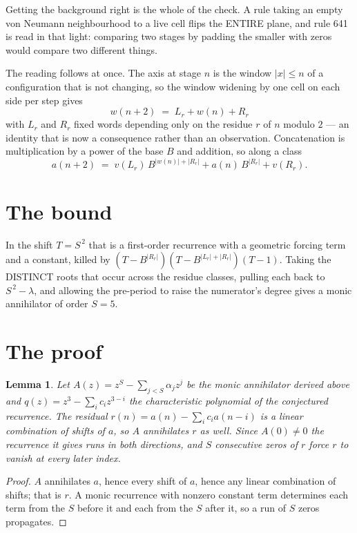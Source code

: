 \documentclass[11pt,a4paper]{article}
\theoremstyle{plain}
\newtheorem{lemma}[theorem]{Lemma}
\theoremstyle{definition}
\begin{document}
Getting the background right is the whole of the check. A rule taking an empty von Neumann
neighbourhood to a live cell flips the ENTIRE plane, and rule 641 is read
in that light: comparing two stages by padding the smaller with zeros would compare two
different things.

The reading follows at once. The axis at stage $n$ is the window $|x|\le n$ of a configuration
that is not changing, so the window widening by one cell on each side per step gives
\[
w(n+2)\;=\;L_r + w(n) + R_r
\]
with $L_r$ and $R_r$ fixed words depending only on the residue $r$ of $n$ modulo $2$ --- an
identity that is now a consequence rather than an observation. Concatenation is multiplication
by a power of the base $B$ and addition, so along a class
\[
a(n+2)\;=\;v(L_r)\,B^{|w(n)|+|R_r|} + a(n)\,B^{|R_r|} + v(R_r).
\]

\section{The bound}

In the shift $T=S^{\,2}$ that is a first-order recurrence with a geometric forcing term and a
constant, killed by $(T-B^{|R_r|})(T-B^{|L_r|+|R_r|})(T-1)$. Taking the DISTINCT roots that
occur across the residue classes, pulling each back to $S^{\,2}-\lambda$, and allowing the
pre-period to raise the numerator's degree gives a monic annihilator of order $S=5$.

\section{The proof}

\begin{lemma}\label{lem:crit}
Let $A(z)=z^S-\sum_{j<S}\alpha_jz^{j}$ be the monic annihilator derived above and
$q(z)=z^{3}-\sum_ic_iz^{3-i}$ the characteristic polynomial of the conjectured
recurrence. The residual $r(n)=a(n)-\sum_ic_ia(n-i)$ is a linear combination of shifts of $a$,
so $A$ annihilates $r$ as well. Since $A(0)\ne0$ the recurrence it gives runs in both
directions, and $S$ consecutive zeros of $r$ force $r$ to vanish at every later index.
\end{lemma}

\begin{proof}
$A$ annihilates $a$, hence every shift of $a$, hence any linear combination of shifts; that is
$r$. A monic recurrence with nonzero constant term determines each term from the $S$ before it
and each from the $S$ after it, so a run of $S$ zeros propagates.
\end{proof}
\end{document}

